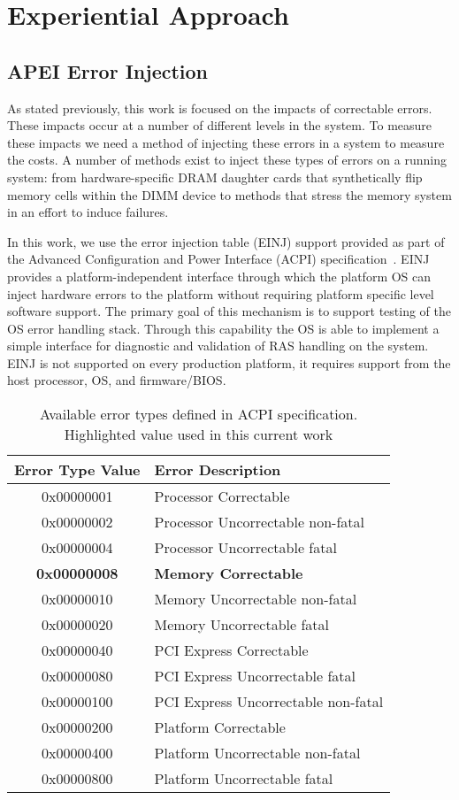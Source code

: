 
\section{Experiential Approach}
\label{sec:approach}

\subsection{APEI Error Injection}

As stated previously, this work is focused on the impacts of correctable errors.
These impacts occur at a number of different levels in the system.  To measure
these impacts we need a method of injecting these errors in a system to measure
the costs.  A number of methods exist to inject these types of errors on a
running system: from hardware-specific DRAM daughter cards that synthetically
flip memory cells within the DIMM device to methods that stress the memory
system in an effort to induce failures. 

In this work, we use the error injection table (EINJ) support provided as part
of the Advanced Configuration and Power Interface (ACPI)
specification~\cite{ACPISpec}.  EINJ provides a platform-independent interface
through which the platform OS can inject hardware errors to the platform without
requiring platform specific level software support. The primary goal of this
mechanism is to support testing of the OS error handling stack. Through this
capability the OS is able to implement a simple interface for diagnostic and
validation of RAS handling on the system.  EINJ is not supported on 
every production platform, it requires support from the host processor, OS, and
firmware/BIOS.

\begin{table}
\centering
\begin{tabular}{ c l }
\toprule
Error Type Value & Error Description \\
\midrule
 0x00000001 & Processor Correctable\\
 0x00000002 & Processor Uncorrectable non-fatal \\
 0x00000004 & Processor Uncorrectable fatal \\
        {\bf{0x00000008}} & {\bf{Memory Correctable}} \\
 0x00000010 & Memory Uncorrectable non-fatal \\
 0x00000020 & Memory Uncorrectable fatal \\
 0x00000040 & PCI Express Correctable \\
 0x00000080 & PCI Express Uncorrectable fatal \\
 0x00000100 & PCI Express Uncorrectable non-fatal \\
 0x00000200 & Platform Correctable \\
 0x00000400 & Platform Uncorrectable non-fatal \\
 0x00000800 & Platform Uncorrectable fatal \\
\bottomrule
\end{tabular}
\vspace{.6em}
\caption{
        Available error types defined in ACPI specification.  Highlighted value
        used in this current work 
}
\label{tab:einj}
\end{table}

